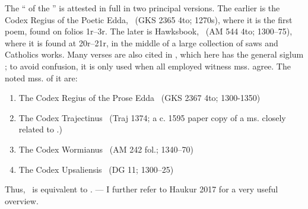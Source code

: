 

{\small The “ of the ” is attested in full in two principal versions. The earlier is the Codex Regius of the Poetic Edda, \Regius\ (GKS 2365 4to; 1270s), where it is the first poem, found on folios 1r–3r. The later is Hawksbook, \Hauksbok\ (AM 544 4to; 1300–75), where it is found at 20r–21r, in the middle of a large collection of saws and Catholics works. Many verses are also cited in \Gylfaginning, which here has the general siglum \GylfMS; to avoid confusion, it is only used when all employed witness mss. agree. The noted mss. of it are:\begin{enumerate} %
	\item The Codex Regius of the Prose Edda \RegiusProse\ (GKS 2367 4to; 1300-1350)
	\item The Codex Trajectinus \Trajectinus\ (Traj 1374; a c. 1595 paper copy of a ms. closely related to \RegiusProse.)
	\item The Codex Wormianus \Wormianus\ (AM 242 fol.; 1340–70)
	\item The Codex Upsaliensis \Upsaliensis\ (DG 11; 1300–25)
\end{enumerate}

Thus, \GylfMS\ is equivalent to \RegiusProse\Trajectinus\Wormianus\Upsaliensis. — I further refer to Haukur 2017 for a very useful overview.

}
